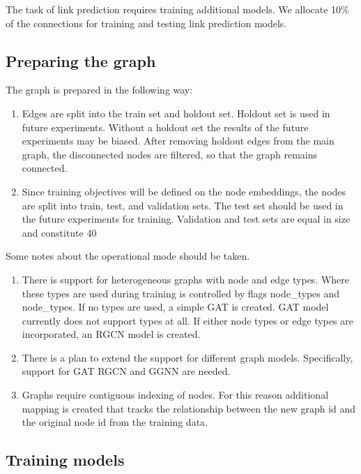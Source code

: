 \documentclass[a4paper,twoside]{article}
\begin{document}
The task of link prediction requires training additional models. We allocate 10\% of the connections for training and testing link prediction models.

\subsection{Preparing the graph}
The graph is prepared in the following way:
\begin{enumerate}
    \item Edges are split into the train set and holdout set. Holdout set is used in future experiments. Without a holdout set the results of the future experiments may be biased. After removing holdout edges from the main graph, the disconnected nodes are filtered, so that the graph remains connected.
    \item Since training objectives will be defined on the node embeddings, the nodes are split into train, test, and validation sets. The test set should be used in the future experiments for training. Validation and test sets are equal in size and constitute 40%
\end{enumerate}

Some notes about the operational mode should be taken. 
\begin{enumerate}
    \item There is support for heterogeneous graphs with node and edge types. Where these types are used during training is controlled by flags node_types and node_types. If no types are used, a simple GAT is created. GAT model currently does not support types at all. If either node types or edge types are incorporated, an RGCN model is created. 
    \item There is a plan to extend the support for different graph models. Specifically, support for  GAT RGCN and GGNN are needed. 
    \item Graphs require contiguous indexing of nodes. For this reason additional mapping is created that tracks the relationship between the new graph id and the original node id from the training data.
\end{enumerate}

\subsection{Training models}
\end{document}
